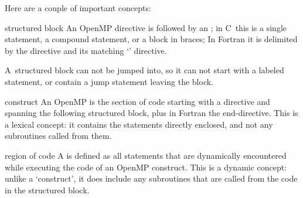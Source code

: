 Here are a couple of important concepts:
\begin{definition}
\item[structured block] An OpenMP directive is followed by an
  ; in C~this is a single statement, a
  compound statement, or a block in braces; In Fortran it is
  delimited by the directive and its matching `' directive.

  A~structured block can not be jumped into, so it can not start with a
  labeled statement, or contain a jump statement leaving the block.
\item[construct] An OpenMP  is the section of code
  starting with a directive and spanning the following structured block,
  plus in Fortran the end-directive. This is a lexical concept: it contains
  the statements directly enclosed, and not any subroutines called from them.
\item[region of code] A  is defined as all statements
  that are dynamically encountered while executing the code of an OpenMP construct.
  This is a dynamic concept: unlike a `construct', it does include any subroutines
  that are called from the code in the structured block.
\end{definition}

\endinput

\Level 0 {Thread data}

In most programming languages, visibility of data
is governed by rules on the \indextermbus{scope}{of variables}:
a~variable is declared in a block, and it is then visible to any
statement in that block and blocks with a \indextermsub{lexical}{scope}
contained in it, but not in surrounding blocks:
\begin{lstlisting}
main () {
  // no variable `x' define here
  {
    int x = 5;
    if (somecondition) { x = 6; }
    printf("x=%e\n",x); // prints 5 or 6
  }
  printf("x=%e\n",x); // syntax error: `x' undefined
}
\end{lstlisting}
Fortran has simpler rules, since it does not have blocks inside blocks.

OpenMP has similar rules concerning data in parallel regions
and other OpenMP constructs. First of all, data is visible
in enclosed scopes:
\begin{lstlisting}
main() {
  int x;
#pragma omp parallel
  {
     // you can use and set `x' here
  }
  printf("x=%e\n",x); // value depends on what
                      // happened in the parallel region
}
\end{lstlisting}

